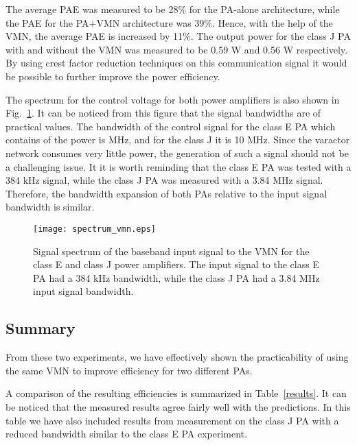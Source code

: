 \documentclass[10pt,journal]{IEEEtran}
\begin{document}
The average PAE was measured to be 28\% for the PA-alone architecture, while the PAE for the PA+VMN architecture was 39\%. Hence, with the help of the VMN, the average PAE is increased by 11\%. The output power for the class J PA with and without the VMN was measured to be 0.59 W and 0.56 W respectively. By using crest factor reduction techniques on this communication signal it would be possible to further improve the power efficiency.

The spectrum for the control voltage for both power amplifiers is also shown in Fig.~\ref{spct_vmn}. It can be noticed from this figure that the signal bandwidths are of practical values. The bandwidth of the control signal for the class E PA which contains  of the power is  MHz, and for the class J it is 10 MHz. Since the varactor network consumes very little power, the generation of such a signal should not be a challenging issue. It it is worth reminding that the class E PA was tested with a 384 kHz signal, while the class J PA was measured with a 3.84 MHz signal. Therefore, the bandwidth expansion of both PAs relative to the input signal bandwidth is similar.

\begin{figure}
\centering
\texttt{[image: spectrum\_vmn.eps]}
\caption{Signal spectrum of the baseband input signal to the VMN for the class E and class J power amplifiers. The input signal to the class E PA had a 384 kHz bandwidth, while the class J PA had a 3.84 MHz input signal bandwidth.}
\label{spct_vmn}
\end{figure}

\subsection{Summary}
From these two experiments, we have effectively shown the practicability of using the same VMN to improve efficiency for two different PAs.

A comparison of the resulting efficiencies is summarized in Table~\ref{results}. It can be noticed that the measured results agree fairly well with the predictions. In this table we have also included results from measurement on the class J PA with a reduced bandwidth similar to the class E PA experiment.
\end{document}
